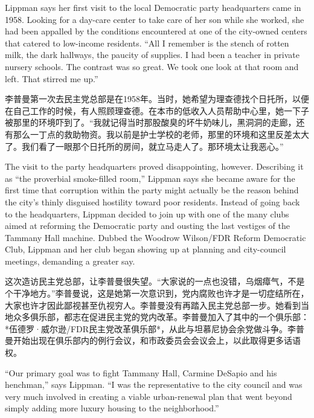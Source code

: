 \ifdefined\eng
Lippman says her first visit to the local Democratic party headquarters came in 1958. Looking for a day-care center to take care of her son while she worked, she had been appalled by the conditions encountered at one of the city-owned centers that catered to low-income residents. ``All I remember is the stench of rotten milk, the dark hallways, the paucity of supplies. I had been a teacher in private nursery schools. The contrast was so great. We took one look at that room and left. That stirred me up.''
\fi

\ifdefined\chs
李普曼第一次去民主党总部是在1958年。当时，她希望为理查德找个日托所，以便在自己工作的时候，有人照顾理查德。在本市的低收入人员帮助中心里，她一下子被那里的环境吓到了。“我就记得当时那股酸臭的坏牛奶味儿，黑洞洞的走廊，还有那么一丁点的救助物资。我以前是护士学校的老师，那里的环境和这里反差太大了。我们看了一眼那个日托所的房间，就立马走人了。那环境太让我恶心。”
\fi

\ifdefined\eng
The visit to the party headquarters proved disappointing, however. Describing it as ``the proverbial smoke-filled room,'' Lippman says she became aware for the first time that corruption within the party might actually be the reason behind the city's thinly disguised hostility toward poor residents. Instead of going back to the headquarters, Lippman decided to join up with one of the many clubs aimed at reforming the Democratic party and ousting the last vestiges of the Tammany Hall machine. Dubbed the Woodrow Wilson/FDR Reform Democratic Club, Lippman and her club began showing up at planning and city-council meetings, demanding a greater say.
\fi

\ifdefined\chs
这次造访民主党总部，让李普曼很失望。“大家说的一点也没错，乌烟瘴气，不是个干净地方。”李普曼说，这是她第一次意识到，党内腐败也许才是一切症结所在，大家也许才因此鄙视甚至仇视穷人。李普曼没有再踏入民主党总部一步。她看到当地众多俱乐部，都志在促进民主党的党内改革。李普曼加入了其中的一个俱乐部：*伍德罗·威尔逊/FDR民主党改革俱乐部*，从此与坦慕尼协会余党做斗争。李普曼开始出现在俱乐部内的例行会议，和市政委员会会议会上，以此取得更多话语权。
\fi

\ifdefined\eng
``Our primary goal was to fight Tammany Hall, Carmine DeSapio and his henchman,'' says Lippman. ``I was the representative to the city council and was very much involved in creating a viable urban-renewal plan that went beyond simply adding more luxury housing to the neighborhood.''
\fi

